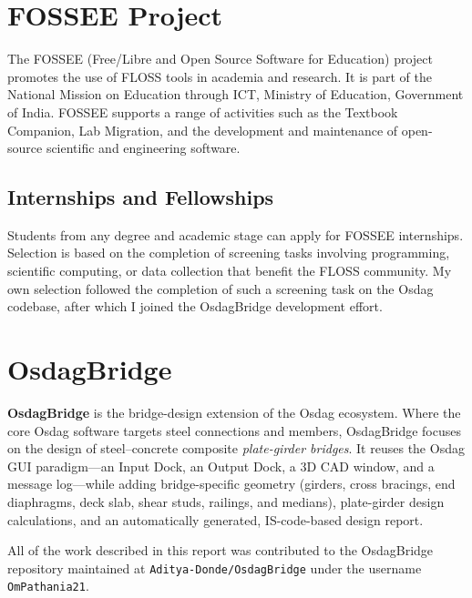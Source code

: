 \section{FOSSEE Project}
The FOSSEE (Free/Libre and Open Source Software for Education) project promotes the use of
FLOSS tools in academia and research. It is part of the National Mission on Education through
ICT, Ministry of Education, Government of India. FOSSEE supports a range of activities such
as the Textbook Companion, Lab Migration, and the development and maintenance of open-source
scientific and engineering software.

\subsection{Internships and Fellowships}
Students from any degree and academic stage can apply for FOSSEE internships. Selection is
based on the completion of screening tasks involving programming, scientific computing, or
data collection that benefit the FLOSS community. My own selection followed the completion of
such a screening task on the Osdag codebase, after which I joined the OsdagBridge development
effort.

\section{OsdagBridge}
\textbf{OsdagBridge} is the bridge-design extension of the Osdag ecosystem. Where the core
Osdag software targets steel connections and members, OsdagBridge focuses on the design of
steel--concrete composite \emph{plate-girder bridges}. It reuses the Osdag GUI paradigm---an
Input Dock, an Output Dock, a 3D CAD window, and a message log---while adding
bridge-specific geometry (girders, cross bracings, end diaphragms, deck slab, shear studs,
railings, and medians), plate-girder design calculations, and an automatically generated,
IS-code-based design report.

All of the work described in this report was contributed to the OsdagBridge repository
maintained at \texttt{Aditya-Donde/OsdagBridge} under the username \texttt{OmPathania21}.

